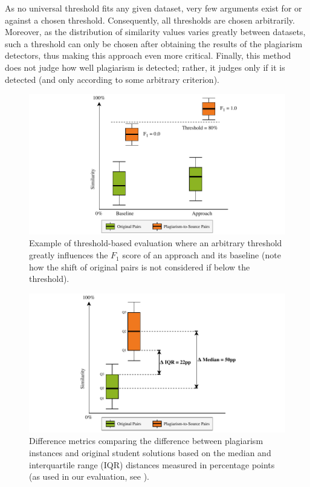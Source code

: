 As no universal threshold fits any given dataset, very few arguments exist for or against a chosen threshold. Consequently, all thresholds are chosen arbitrarily. Moreover, as the distribution of similarity values varies greatly between datasets, such a threshold can only be chosen after obtaining the results of the plagiarism detectors, thus making this approach even more critical.
Finally, this method does not judge how well plagiarism is detected; rather, it judges only if it is detected (and only according to some arbitrary criterion).

\begin{figure}
    \centering
    \includegraphics[width=0.95\linewidth]{figures/methodology/Metrics-Thresh.pdf}
    \caption[Problematic Use of Threshold-based Metrics]{Example of threshold-based evaluation where an arbitrary threshold greatly influences the $F_1$ score of an approach and its baseline (note how the shift of original pairs is not considered if below the threshold).}
    \label{fig:diff-threshold-abuse}
\end{figure}

\begin{figure}
    \centering
    \includegraphics[width=0.95\linewidth]{figures/methodology/DiffMetrics.pdf}
    \caption[Difference Metrics in Plagiarism Evaluations]{Difference metrics comparing the difference between plagiarism instances and original student solutions based on the median and interquartile range (IQR) distances measured in percentage points (as used in our evaluation, see \gqm).}
    \label{fig:diff-metrics}
\end{figure}

